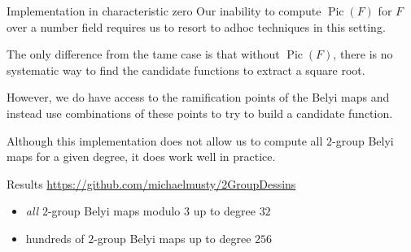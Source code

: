 \documentclass[xcolor=dvipsnames,handout]{beamer}
\theoremstyle{plain}
\DeclareMathOperator{\Pic}{Pic}
\begin{document}
{\begin{frame}{Implementation in characteristic zero}
      Our inability to compute $\Pic(F)$
      for $F$ over a number field requires
      us to resort to adhoc techniques in this setting.
      \pause\par
      The only difference from the tame case is that
      without $\Pic(F)$, there is no systematic way
      to find the candidate functions to extract
      a square root.
      \pause\par
      However, we do have access to the ramification points
      of the Belyi maps and instead use combinations
      of these points to try to build a candidate function.
      \pause\par
      Although this implementation does not allow us
      to compute all $2$-group Belyi maps for a given
      degree, it does work well in practice.
    \end{frame}
    \begin{frame}{Results}
        \url{https://github.com/michaelmusty/2GroupDessins}
      \begin{itemize}
        \item
          \emph{all} $2$-group Belyi maps modulo $3$ up to degree $32$
        \item
          hundreds of $2$-group Belyi maps up to degree $256$
      \end{itemize}
    \end{frame}
  }
\end{document}
